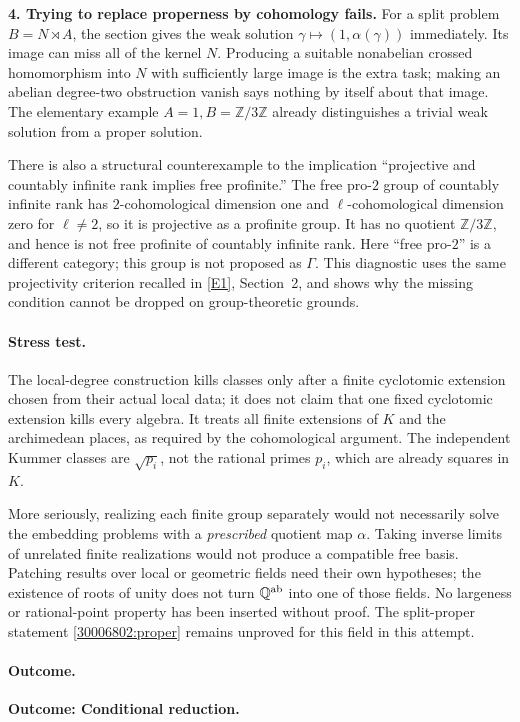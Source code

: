 \documentclass[11pt,a4paper]{article}
\newcommand{\Z}{\mathbb{Z}}
\newcommand{\Q}{\mathbb{Q}}
\newcommand{\eref}[2]{\hyperlink{extra:#1:#2}{[E#2]}}
\numberwithin{equation}{section}
\begin{document}
\textbf{4. Trying to replace properness by cohomology fails.}
For a split problem $B=N\rtimes A$, the section gives the weak solution
$\gamma\mapsto(1,\alpha(\gamma))$ immediately. Its image can miss all
of the kernel $N$. Producing a suitable nonabelian crossed homomorphism
into $N$ with sufficiently large image is the extra task; making an
abelian degree-two obstruction vanish says nothing by itself about that
image. The elementary example $A=1,B=\Z/3\Z$ already distinguishes a
trivial weak solution from a proper solution.

There is also a structural counterexample to the implication
``projective and countably infinite rank implies free profinite.''
The free pro-$2$ group of countably infinite rank has $2$-cohomological
dimension one and $\ell$-cohomological dimension zero for $\ell\ne2$,
so it is projective as a profinite group. It has no quotient $\Z/3\Z$,
and hence is not free profinite of countably infinite rank. Here
``free pro-$2$'' is a different category; this group is not proposed as
$\Gamma$. This diagnostic uses the same projectivity criterion recalled
in \eref{30006802}{1}, Section~2, and shows why the missing condition cannot
be dropped on group-theoretic grounds.

\paragraph{Stress test.}
The local-degree construction kills classes only after a finite
cyclotomic extension chosen from their actual local data; it does not
claim that one fixed cyclotomic extension kills every algebra. It treats
all finite extensions of $K$ and the archimedean places, as required by
the cohomological argument. The independent Kummer classes are
$\sqrt{p_i}$, not the rational primes $p_i$, which are already squares
in $K$.

More seriously, realizing each finite group separately would not
necessarily solve the embedding problems with a \emph{prescribed}
quotient map $\alpha$. Taking inverse limits of unrelated finite
realizations would not produce a compatible free basis. Patching
results over local or geometric fields need their own hypotheses; the
existence of roots of unity does not turn $\Q^{\rm ab}$ into one of
those fields. No largeness or rational-point property has been inserted
without proof. The split-proper statement \eqref{30006802:proper} remains
unproved for this field in this attempt.

\paragraph{Outcome.}
\textbf{Outcome: Conditional reduction.}
\end{document}
